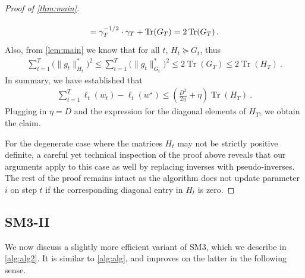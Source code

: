 \documentclass[a4paper,11pt]{article}
\DeclareMathOperator*{\trace}{Tr}
\newcommand{\lr}[1]{\mathopen{}\left(#1\right)}
\newcommand{\Lr}[1]{\mathopen{}\big(#1\big)}
\newcommand{\norm}[1]{\|#1\|}
\newcommand{\set}[1]{\{#1\}}
\let\nablaold\nabla
\renewcommand{\nabla}{\nablaold\mkern-1mu}
\def\NAME{SM3\xspace}
\newcommand{\tmx}[1]{\mu'_{#1}}
\newcommand{\tmi}[1]{\nu'_{#1}}
\begin{document}
\begin{proof}[Proof of \cref{thm:main}]
\begin{align*}
  =
  \vphantom{\sum^T}
  \gamma_T^{-1/2} \cdot \gamma_T + \trace(G_T)
  =
  \vphantom{\sum^T}
  2\trace\lr{ G_T }
  .
\end{align*}
Also, from \cref{lem:main} we know that for all $t$, $H_t \succeq G_t$, thus
\begin{align*}
  \sum_{t=1}^T \Lr{\norm{g_t}_{H_t}^*}^2
  \leq
  \sum_{t=1}^T \Lr{\norm{g_t}_{G_t}^*}^2
  \leq
  2\trace(G_T)
  \leq
  2\trace(H_T)
  ~.
\end{align*}
In summary, we have established that
\begin{align*}
  \sum_{t=1}^T \ell_t(w_t) - \ell_t(w^\star)
  \leq
  \lr{\frac{D^2}{2\eta} + \eta} \trace(H_T)
  ~.
\end{align*}
Plugging in $\eta = D$ and the expression for the diagonal elements of $H_T$, we
obtain the claim.

For the degenerate case where the matrices $H_t$ may not be strictly positive
definite, a careful yet technical inspection of the proof above reveals that our
arguments apply to this case as well by replacing inverses with
pseudo-inverses. The rest of the proof remains intact as the algorithm does not
update parameter $i$ on step $t$ if the corresponding diagonal entry in $H_t$ is
zero.
\end{proof}



\subsection{\NAME-II}

We now discuss a slightly more efficient variant of \NAME, which we describe in \cref{alg:alg2}.
It is similar to \cref{alg:alg}, and improves on the latter in the following sense.

\end{document}

